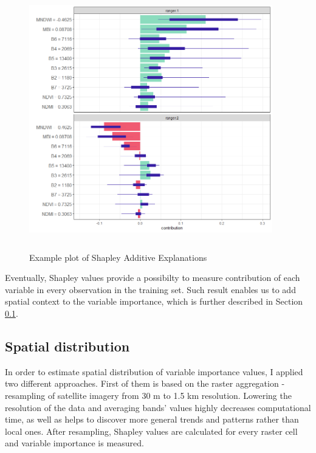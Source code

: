 \documentclass{amuthesis}
\begin{document}
\begin{figure}[H]

{\centering \includegraphics[width=4.16667in,height=4.45833in]{./figures/shapley_values.png}

}

\caption{\label{fig-rycina8}Example plot of Shapley Additive
Explanations}

\end{figure}

Eventually, Shapley values provide a possibilty to measure contribution
of each variable in every observation in the training set. Such result
enables us to add spatial context to the variable importance, which is
further described in Section \ref{sec-importance-distribution}.

\hypertarget{sec-importance-distribution}{%
\subsection{Spatial distribution}\label{sec-importance-distribution}}

In order to estimate spatial distribution of variable importance values,
I applied two different approaches. First of them is based on the raster
aggregation - resampling of satellite imagery from 30 m to 1.5 km
resolution. Lowering the resolution of the data and averaging bands'
values highly decreases computational time, as well as helps to discover
more general trends and patterns rather than local ones. After
resampling, Shapley values are calculated for every raster cell and
variable importance is measured.
\end{document}
